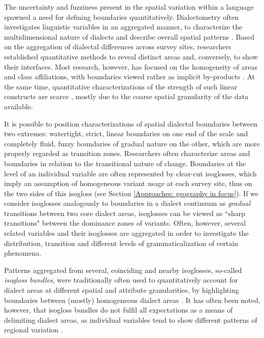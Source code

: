 \documentclass[output=paper]{langscibook}
\begin{document}
The uncertainty and fuzziness present in the spatial variation within a language spawned a need for defining boundaries quantitatively. Dialectometry often investigates linguistic variables in an aggregated manner, to characterize the multidimensional nature of dialects and describe overall spatial patterns \parencite[e.g., ][]{Seguy1971, Goebl1982, Nerbonne1999,   Szmrecsanyi2012}.
Based on the aggregation of dialectal differences across survey sites, researchers established quantitative methods to reveal distinct areas and, conversely, to show their interfaces. Most research, however, has focused on the homogeneity of areas and class affiliations, with boundaries viewed rather as implicit by-products  \parencite[e.g.,][]{Daan1969, Heeringa2001, Heeringa2004, Rumpf2009}. At the same time, quantitative characterizations of the strength of such linear constructs are scarce \parencite[e.g.][]{JeszenszkyPaper2}, mostly due to the coarse spatial granularity  of the data available.

It is possible to position characterizations of spatial dialectal boundaries between two extremes: watertight, strict, linear boundaries on one end of the scale and completely fluid, fuzzy boundaries of gradual nature on the other, which are more properly regarded as transition zones. Researchers often characterize areas and boundaries in relation to the transitional nature of change. Boundaries at the level of an individual variable are often represented by clear-cut isoglosses, which imply an assumption of homogeneous variant usage at each survey site, thus on the two sides of this isogloss (see Section \ref{Approaches: geography in focus}). If we consider isoglosses analogously to boundaries in a dialect continuum as \textit{gradual} transitions between two core dialect areas, isoglosses can be viewed as ``sharp transitions" between the dominance zones of variants. Often, however, several related variables and their isoglosses \parencite[][]{Seiler2005, Glaser2006b,Stoeckle2018, Willis2019} are aggregated in order to investigate the distribution, transition and different levels of grammaticalization of certain phenomena.

Patterns aggregated from several, coinciding and nearby isoglosses, so-called \textit{isogloss bundles}, were traditionally often used to quantitatively account for dialect areas at different spatial and attribute granularities,
by highlighting boundaries between (mostly) homogeneous dialect areas  \parencite{Handler1982}. It has often been noted, however, that isogloss bundles do not fulfil all expectations as a means of delimiting dialect areas, as individual variables tend to show different patterns of regional variation \parencite[94--103]{Chambers2004}.
\end{document}
